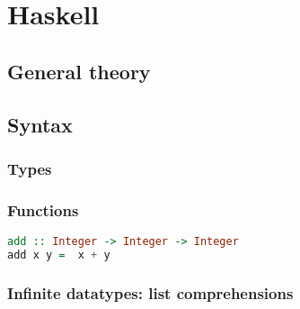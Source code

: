 \section{Haskell}

\subsection{General theory}

\subsection{Syntax}

\subsubsection{Types}

\subsubsection{Functions}

\begin{lstlisting}[language=haskell]
add :: Integer -> Integer -> Integer
add x y =  x + y
\end{lstlisting}

\subsubsection{Infinite datatypes: list comprehensions}